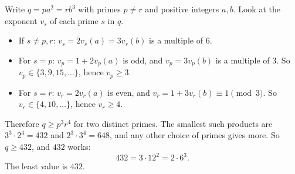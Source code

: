 Write $q=pa^2=rb^3$ with primes $p\ne r$ and positive integers $a,b$. Look at the exponent $v_s$ of each prime $s$ in $q$.
\begin{itemize}
\item If $s\ne p,r$: $v_s=2v_s(a)=3v_s(b)$ is a multiple of $6$.
\item For $s=p$: $v_p=1+2v_p(a)$ is odd, and $v_p=3v_p(b)$ is a multiple of $3$. So $v_p\in\{3,9,15,\dots\}$, hence $v_p\ge3$.
\item For $s=r$: $v_r=2v_r(a)$ is even, and $v_r=1+3v_r(b)\equiv1\pmod 3$. So $v_r\in\{4,10,\dots\}$, hence $v_r\ge4$.
\end{itemize}
Therefore $q\ge p^3r^4$ for two distinct primes. The smallest such products are $3^3\cdot2^4=432$ and $2^3\cdot3^4=648$, and any other choice of primes gives more. So $q\ge432$, and $432$ works:
\[
432=3\cdot12^2=2\cdot6^3 .
\]
The least value is $\boxed{432}$.
